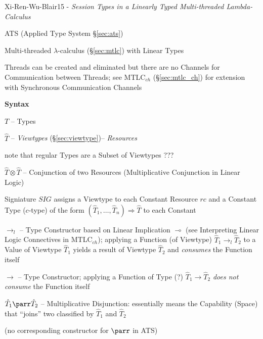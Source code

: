 \begingroup

\renewcommand{\Unit}{\mathbf{1}}
\newcommand{\bool}{\mathsf{bool}}
\newcommand{\Bool}{\mathsf{Bool}}
\newcommand{\Choose}{\mathsf{Choose}}
\newcommand{\Nil}{\mathsf{Nil}}
\newcommand{\Send}{\mathsf{Send}}
\newcommand{\Recv}{\mathsf{Recv}}
\newcommand{\Service}{\mathsf{Service}}
\newcommand{\chpos}{\mathbf{chpos}}
\newcommand{\chneg}{\mathbf{chneg}}

Xi-Ren-Wu-Blair15 - \emph{Session Types in a Linearly Typed
  Multi-threaded Lambda-Calculus}

\fist ATS (Applied Type System \S\ref{sec:ats})

Multi-threaded $\lambda$-calculus (\S\ref{sec:mtlc}) with Linear Types

Threads can be created and eliminated but there are no Channels for
Communication between Threads; see MTLC$_{ch}$ (\S\ref{sec:mtlc_ch})
for extension with Synchronous Communication Channels


\textbf{Syntax}


$T$ -- Types

$\hat{T}$ -- \emph{Viewtypes} (\S\ref{sec:viewtype})--
\emph{Resources}

note that regular Types are a Subset of Viewtypes ??? %

$\hat{T} \otimes \hat{T}$ -- Conjunction of two Resources
(Multiplicative Conjunction in Linear Logic)

Signiature $SIG$ assigns a Viewtype to each Constant Resource $rc$ and
a Constant Type ($c$-type) of the form $(\hat{T}_1, \ldots, \hat{T}_n)
\Rightarrow \hat{T}$ to each Constant

$\rightarrow_l$ -- Type Constructor based on Linear Implication
$\multimap$ (see Interpreting Linear Logic Connectives in
MTLC$_{ch}$); applying a Function (of Viewtype) $\hat{T}_1
\rightarrow_l \hat{T}_2$ to a Value of Viewtype $\hat{T}_1$ yields a
result of Viewtype $\hat{T}_2$ and \emph{consumes} the Function itself

$\rightarrow$ -- Type Constructor; applying a Function of Type (?)
$\hat{T}_1 \rightarrow \hat{T}_2$ \emph{does not consume} the Function
itself

$\hat{T}_1 \parr \hat{T}_2$ -- Multiplicative Disjunction: essentially
means the Capability (Space) that ``joins'' two classified by
$\hat{T}_1$ and $\hat{T}_2$

(no corresponding constructor for $\parr$ in ATS)

